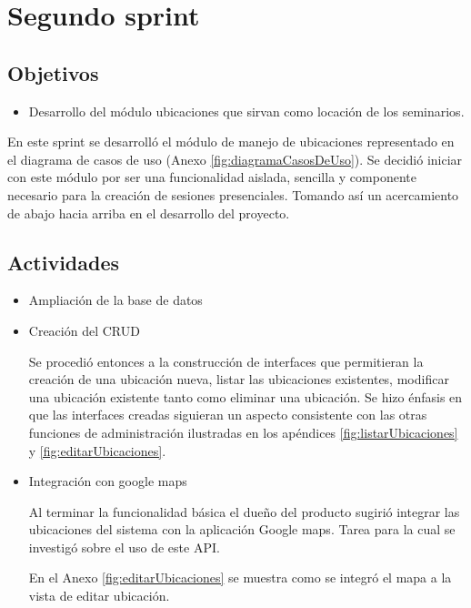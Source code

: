 \section{Segundo sprint} %
\label{sec:segundo_sprint}

\subsection{Objetivos}

\begin{itemize}
	\item Desarrollo del módulo ubicaciones que sirvan como locación de los seminarios.
\end{itemize}

En este sprint se desarrolló el módulo de manejo de ubicaciones representado en el diagrama de casos de uso (Anexo \ref{fig:diagramaCasosDeUso}). Se decidió iniciar con este módulo por ser una funcionalidad aislada, sencilla y componente necesario para la creación de sesiones presenciales. Tomando así un acercamiento de abajo hacia arriba en el desarrollo del proyecto.

\subsection{Actividades} %
\label{sub:actividades2}

\begin{itemize}

\item Ampliación de la base de datos

\item Creación del \gls{CRUD}


Se procedió entonces a la construcción de interfaces que permitieran la creación de una ubicación nueva, listar las ubicaciones existentes, modificar una ubicación existente tanto como eliminar una ubicación. Se hizo énfasis en que las interfaces creadas siguieran un aspecto consistente con las otras funciones de administración ilustradas en los apéndices \ref{fig:listarUbicaciones} y \ref{fig:editarUbicaciones}.

\item Integración con google maps

Al terminar la funcionalidad básica el dueño del producto sugirió integrar las ubicaciones del sistema con la aplicación Google maps. Tarea para la cual se investigó sobre el uso de este \gls{API}. 

En el Anexo \ref{fig:editarUbicaciones} se muestra como se integró el mapa a la vista de editar ubicación.

\end{itemize}





